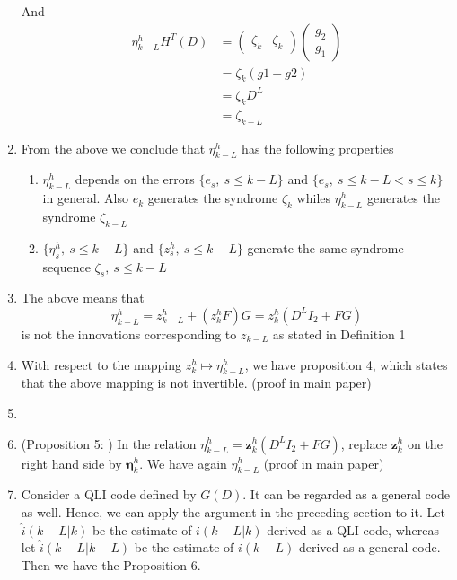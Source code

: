 \documentclass[fontsize=12pt]{article}
\theoremstyle{definition}
\begin{document}
\begin{enumerate}
And 
\begin{equation}
\begin{aligned}
\eta_{k-L}^hH^T(D)&= (\begin{array}{cc}
\zeta_k & \zeta_k
\end{array}) \left(\begin{array}{c}
g_2 \\ g_1
\end{array}\right)\\
&=\zeta_k(g1+g2)\\
&=\zeta_kD^L \\
&= \zeta_{k-L}
\end{aligned}
\end{equation}

\item From the above we conclude that $\eta_{k-L}^h$ has the following properties

\begin{enumerate}
\item $\eta_{k-L}^h$ depends on the errors $\{e_s,~s\leq k-L\}$ and $\{e_s,~s\leq k-L <s \leq k\}$ in general. Also $e_k$ generates the syndrome $\zeta_k$ whiles $\eta_{k-L}^h$ generates the syndrome $\zeta_{k-L}$

\item $\{\eta_{s}^h,~s\leq k-L\} $ and $\{z_s^h,~s\leq k-L\}$ generate the same syndrome sequence $\zeta_{s},~s\leq k-L$
\end{enumerate}
\item The above means that 
\begin{equation}
\eta_{k-L}^h=z_{k-L}^h +(z_k^hF)G=z_k^h(D^LI_2+FG)
\end{equation}
is not the innovations corresponding to $z_{k-L}$ as stated in Definition 1

\item With respect to the mapping $z_k^h \mapsto \eta_{k-L}^h$, we have  proposition 4, which states that the above mapping is not invertible. (proof in main paper)

\item \item (Proposition 5: ) In the relation   $\eta_{k-L}^h=  \mathbf{z}_k^h(D^LI_2+FG)$, replace $\mathbf{z}_k^h$ on the right hand side by $\mathbf{\eta}_k^h$. We have again $\eta_{k-L}^h$ (proof in main paper)

\item Consider a QLI code defined by $G(D)$. It can be regarded
as a general code as well. Hence, we can apply the argument
in the preceding section to it. Let $\hat{i}(k-L|k)$ be the estimate
of $i(k-L|k)$ derived as a QLI code, whereas let $\hat{i}(k-L|k-L)$ be
the estimate of $i(k-L)$ derived as a general code. Then we have
the Proposition 6.


\end{enumerate}
\end{document}

